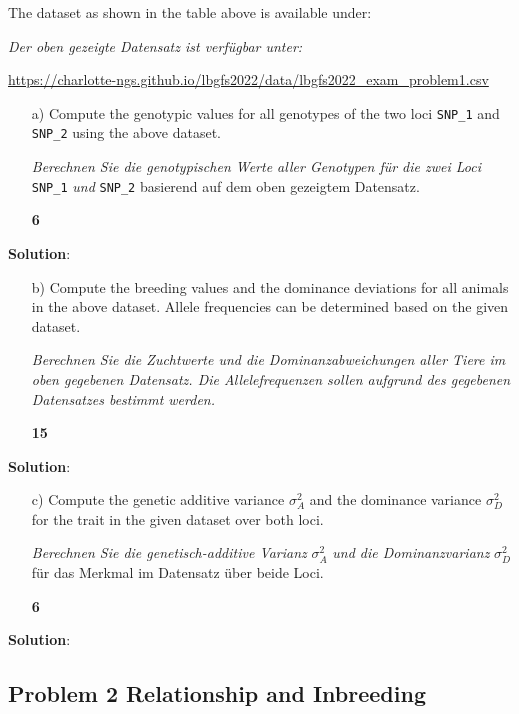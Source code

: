 \documentclass[
]{article}
\newcommand{\points}[1]
{\begin{flushright}\textbf{#1}\end{flushright}}
\newcommand{\solstart}
{\vspace{3ex}\textbf{Solution}:}
\begin{document}
\clearpage
\pagebreak

The dataset as shown in the table above is available under:

\textit{Der oben gezeigte Datensatz ist verfügbar unter:}

\url{https://charlotte-ngs.github.io/lbgfs2022/data/lbgfs2022_exam_problem1.csv}

\vspace{3ex}

\begin{enumerate}
\item[a)] Compute the genotypic values for all genotypes of the two loci  \verb+SNP_1+ and \verb+SNP_2+ using the above dataset.

\textit{Berechnen Sie die genotypischen Werte aller Genotypen für die zwei Loci } \verb+SNP_1+ \textit{ und } \verb+SNP_2+ basierend auf dem oben gezeigtem Datensatz.  
\points{6}
\end{enumerate}

\solstart

\clearpage
\pagebreak

\begin{enumerate}
\item[b)] Compute the breeding values and the dominance deviations for all animals in the above dataset. Allele frequencies can be determined based on the given dataset.

\textit{Berechnen Sie die Zuchtwerte und die Dominanzabweichungen aller Tiere im oben gegebenen Datensatz. Die Allelefrequenzen sollen aufgrund des gegebenen Datensatzes bestimmt werden.}
\points{15}
\end{enumerate}

\solstart

\clearpage
\pagebreak
\begin{enumerate}
\item[c)]  Compute the genetic additive variance $\sigma_A^2$ and the dominance variance $\sigma_D^2$ for the trait in the given dataset over both loci.

\textit{Berechnen Sie die genetisch-additive Varianz } $\sigma_A^2$ \textit{ und die Dominanzvarianz } $\sigma_D^2$ für das Merkmal im Datensatz über beide Loci. 
\points{6}
\end{enumerate}

\solstart

\clearpage
\pagebreak

\hypertarget{problem-2-relationship-and-inbreeding}{%
\subsection{Problem 2 Relationship and
Inbreeding}\label{problem-2-relationship-and-inbreeding}}
\end{document}
